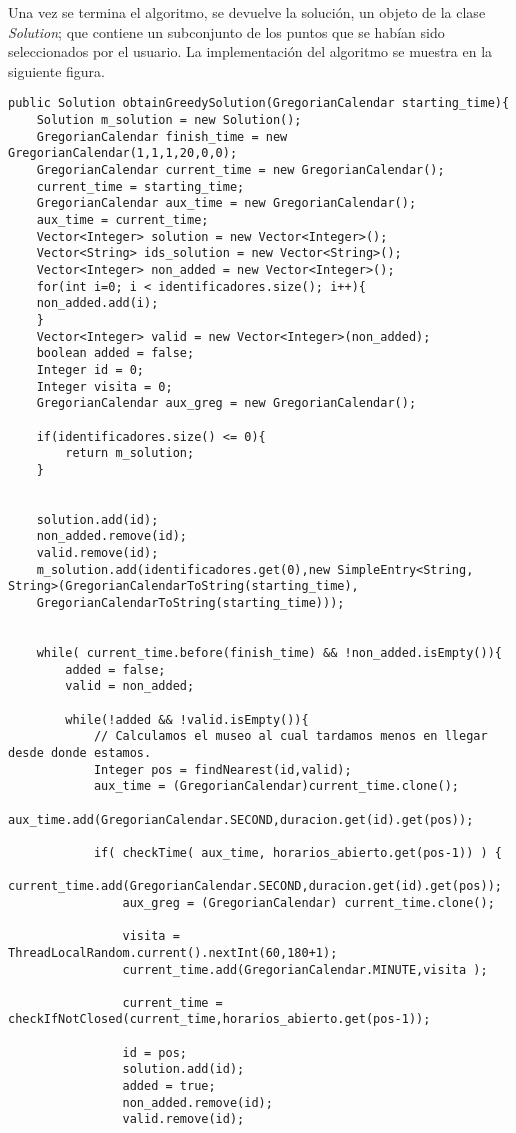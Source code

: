 Una vez se termina el algoritmo, se devuelve la solución, un objeto de la clase \textit{Solution}; que contiene un subconjunto de los puntos que se habían sido seleccionados por el usuario. La implementación del algoritmo se muestra en la siguiente figura.\newline
\begin{lstlisting}[caption=Función para encontrar la ruta entre los puntos seleccionados.]
public Solution obtainGreedySolution(GregorianCalendar starting_time){
	Solution m_solution = new Solution();
	GregorianCalendar finish_time = new GregorianCalendar(1,1,1,20,0,0);
	GregorianCalendar current_time = new GregorianCalendar();
	current_time = starting_time;
	GregorianCalendar aux_time = new GregorianCalendar();
	aux_time = current_time;
	Vector<Integer> solution = new Vector<Integer>();
	Vector<String> ids_solution = new Vector<String>();
	Vector<Integer> non_added = new Vector<Integer>();
	for(int i=0; i < identificadores.size(); i++){
	non_added.add(i);
	}
	Vector<Integer> valid = new Vector<Integer>(non_added);
	boolean added = false;
	Integer id = 0;
	Integer visita = 0;
	GregorianCalendar aux_greg = new GregorianCalendar();
	
	if(identificadores.size() <= 0){
		return m_solution;
	}
	

	solution.add(id);
	non_added.remove(id);
	valid.remove(id);
	m_solution.add(identificadores.get(0),new SimpleEntry<String, String>(GregorianCalendarToString(starting_time),
	GregorianCalendarToString(starting_time)));
	
	
	while( current_time.before(finish_time) && !non_added.isEmpty()){
		added = false;
		valid = non_added;
	
		while(!added && !valid.isEmpty()){
			// Calculamos el museo al cual tardamos menos en llegar desde donde estamos.
			Integer pos = findNearest(id,valid);
			aux_time = (GregorianCalendar)current_time.clone();
			aux_time.add(GregorianCalendar.SECOND,duracion.get(id).get(pos));
			
			if( checkTime( aux_time, horarios_abierto.get(pos-1)) ) {
				current_time.add(GregorianCalendar.SECOND,duracion.get(id).get(pos));
				aux_greg = (GregorianCalendar) current_time.clone();
				
				visita = ThreadLocalRandom.current().nextInt(60,180+1);
				current_time.add(GregorianCalendar.MINUTE,visita );
				
				current_time = checkIfNotClosed(current_time,horarios_abierto.get(pos-1));
				
				id = pos;
				solution.add(id);
				added = true;
				non_added.remove(id);
				valid.remove(id);
				

\end{lstlisting}
